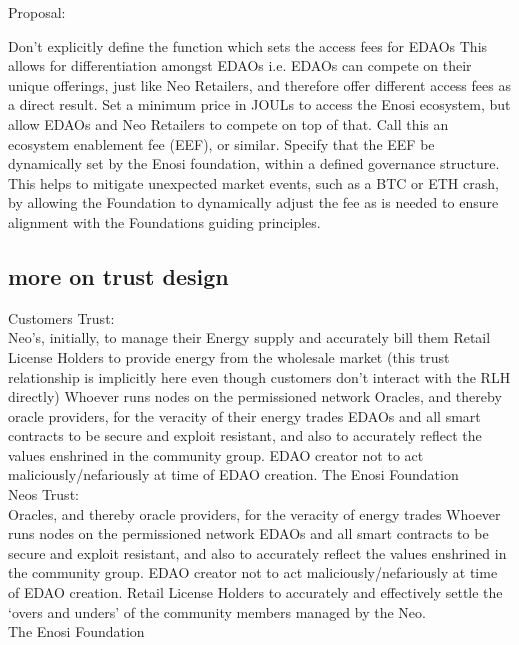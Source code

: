 \documentclass{article}
\theoremstyle{definition}
\theoremstyle{plain} %
\begin{document}
Proposal:

Don’t explicitly define the function which sets the access fees for EDAOs
This allows for differentiation amongst EDAOs
i.e. EDAOs can compete on their unique offerings, just like Neo Retailers, and therefore offer different access fees as a direct result.
Set a minimum price in JOULs to access the Enosi ecosystem, but allow EDAOs and Neo Retailers to compete on top of that. Call this an ecosystem enablement fee (EEF), or similar.
Specify that the EEF be dynamically set by the Enosi foundation, within a defined governance structure. 
This helps to mitigate unexpected market events, such as a BTC or ETH crash, by allowing the Foundation to dynamically adjust the fee as is needed to ensure alignment with the Foundations guiding principles.





\subsection{more on trust design}
Customers Trust:\\

Neo’s, initially, to manage their Energy supply and accurately bill them
Retail License Holders to provide energy from the wholesale market (this trust relationship is implicitly here even though customers don’t interact with the RLH directly)
Whoever runs nodes on the permissioned network
Oracles, and thereby oracle providers, for the veracity of their energy trades
EDAOs and all smart contracts to be secure and exploit resistant, and also to accurately reflect the values enshrined in the community group.
EDAO creator not to act maliciously/nefariously at time of EDAO creation.
The Enosi Foundation\\

Neos Trust:\\

Oracles, and thereby oracle providers, for the veracity of energy trades
Whoever runs nodes on the permissioned network
EDAOs and all smart contracts to be secure and exploit resistant, and also to accurately reflect the values enshrined in the community group.
EDAO creator not to act maliciously/nefariously at time of EDAO creation.
Retail License Holders to accurately and effectively settle the ‘overs and unders’ of the community members managed by the Neo. \\

The Enosi Foundation\\
\end{document}
